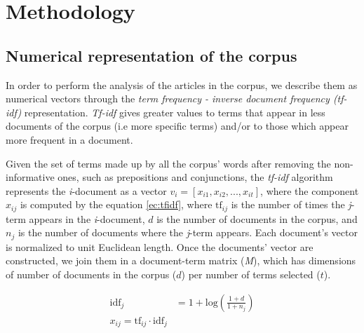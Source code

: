 
\section{Methodology} \label{sec:Methodology}

\subsection{Numerical representation of the corpus}

\par In order to perform the analysis of the articles in the corpus, we describe them as numerical vectors through the \textit{term frequency - inverse document frequency (tf-idf)} representation. \textit{Tf-idf} gives greater values to terms that appear in less documents of the corpus (i.e more specific terms) and/or to those which appear more frequent in a document.

\par Given the set of terms made up by all the corpus' words after removing the non-informative ones, such as prepositions and conjunctions, the \textit{tf-idf} algorithm represents the \textit{i}-document as a vector $v_i = [x_{i1}, x_{i2}, ... , x_{it}]$, where the component $x_{ij}$ is computed by the equation \ref{ec:tfidf}, where $\textrm{tf}_{ij}$ is the number of times the \textit{j}-term appears in the \textit{i}-document, $d$ is the number of documents in the corpus, and $n_j$ is the number of documents where the \textit{j}-term appears. Each document's vector is normalized to unit Euclidean length.
Once the documents' vector are constructed, we join them in a document-term matrix (\emph{M}), which has dimensions of number of documents in the corpus ($d$) per number of terms selected ($t$).

\begin{center}
\begin{equation}
\begin{split}
\text{idf}_{j} & = 1 + \textrm{log}(\frac{1 + d}{1 + n_j}) \\
x_{ij} = \textrm{tf}_{ij} \cdot \textrm{idf}_{j}
\end{split}
\label{ec:tfidf}
\end{equation}
\end{center}

